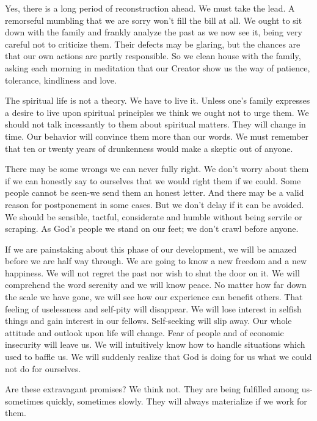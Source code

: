 \begin{biblechapter}
Yes, there is a long period of reconstruction ahead.  We must take the lead.  A remorseful mumbling that we are sorry won't fill the bill at all.  We ought to sit down with the family and frankly analyze the past as we now see it, being very careful not to criticize them.  Their defects may be glaring, but the chances are that our own actions are partly responsible.  So we clean house with the family, asking each morning in meditation that our Creator show us the way of patience, tolerance, kindliness and love.

The spiritual life is not a theory.  We have to live it.  Unless one's family expresses a desire to live upon spiritual principles we think we ought not to urge them.  We should not talk incessantly to them about spiritual matters.  They will change in time.  Our behavior will convince them more than our words.  We must remember that ten or twenty years of drunkenness would make a skeptic out of anyone.

There may be some wrongs we can never fully right.  We don't worry about them if we can honestly say to ourselves that we would right them if we could.  Some people cannot be seen-we send them an honest letter.  And there may be a valid reason for postponement in some cases.  But we don't delay if it can be avoided.  We should be sensible, tactful, considerate and humble without being servile or scraping.  As God's people we stand on our feet; we don't crawl before anyone.

If we are painstaking about this phase of our development, we will be amazed before we are half way through.  We are going to know a new freedom and a new happiness.  We will not regret the past nor wish to shut the door on it.  We will comprehend the word serenity and we will know peace.  No matter how far down the scale we have gone, we will see how our experience can benefit others.  That feeling of uselessness and self-pity will disappear.  We will lose interest in selfish things and gain interest in our fellows.  Self-seeking will slip away.  Our whole attitude and outlook upon life will change.  Fear of people and of economic insecurity will leave us.  We will intuitively know how to handle situations which used to baffle us.  We will suddenly realize that God is doing for us what we could not do for ourselves.

Are these extravagant promises?  We think not.  They are being fulfilled among us-sometimes quickly, sometimes slowly.  They will always materialize if we work for them.


\end{biblechapter}
